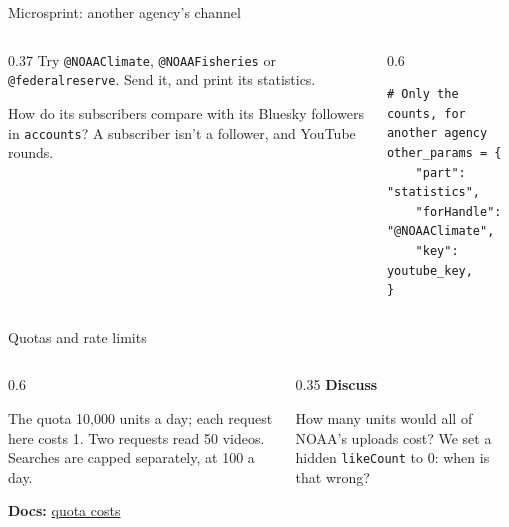 \documentclass[9pt,aspectratio=169]{beamer}
\begin{document}
\begin{frame}[fragile]{Microsprint: another agency's channel}
    \begin{columns}[T]
        \begin{column}{0.37\textwidth}
            Try \texttt{@NOAAClimate}, \texttt{@NOAAFisheries} or \texttt{@federalreserve}. Send it, and print its statistics.

            \medskip
            How do its subscribers compare with its Bluesky followers in \texttt{accounts}? A subscriber isn't a follower, and YouTube rounds.
        \end{column}
        \begin{column}{0.6\textwidth}
\begin{lstlisting}
# Only the counts, for another agency
other_params = {
    "part": "statistics",
    "forHandle": "@NOAAClimate",
    "key": youtube_key,
}
\end{lstlisting}
        \end{column}
    \end{columns}
\end{frame}

\begin{frame}{Quotas and rate limits}
    \begin{columns}[T]
        \begin{column}{0.6\textwidth}
            \begin{alertblock}{The quota}
                \footnotesize 10,000 units a day; each request here costs 1. Two requests read 50 videos. Searches are capped separately, at 100 a day.
            \end{alertblock}
            {\scriptsize\textbf{Docs:} \href{https://developers.google.com/youtube/data/determine_quota_cost}{quota costs}\par}
        \end{column}
        \begin{column}{0.35\textwidth}
            \textbf{Discuss}\\[2pt]
            {\footnotesize How many units would all of NOAA's uploads cost? We set a hidden \texttt{likeCount} to 0: when is that wrong?\par}
        \end{column}
    \end{columns}
\end{frame}
\end{document}
